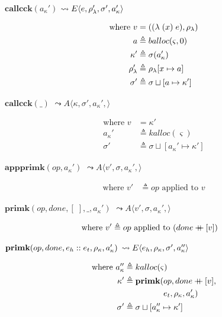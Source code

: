 \documentclass[12pt,draft]{article}
\newcommand\mdoubleplus{\ensuremath{\mathbin{+\mkern-9mu+}}}
\newcommand{\singlelamsyn}[2]{(\lambda\;(#1)\;#2)}
\newcommand{\store}[0]{\sigma}
\newcommand{\baddr}[0]{a}
\newcommand{\kaddr}[0]{a_{\kappa}}
\newcommand{\kont}[0]{\kappa}
\newcommand{\state}[0]{\varsigma}
\newcommand{\E}[4]{E\langle #1 , #2 , #3 , #4 \rangle}
\newcommand{\A}[4]{A\langle #1 , #2 , #3 , #4 \rangle}
\begin{document}
\begin{multicols*}{2}
\begin{center}
  $\textbf{callcck}(\kaddr')$
  $\leadsto \E{e}{\lamenv'}{\store'}{\kaddr'}$
\end{center}
\vspace{-7mm}
\begin{align*}
  \text{where }
  v &= (\singlelamsyn{x}{e} , \lamenv) \\
  \baddr &\triangleq balloc(\state, 0) \\
  \kont' &\triangleq \store(\kaddr') \\
  \lamenv' &\triangleq \lamenv[x \mapsto \baddr] \\
  \store' &\triangleq \store \sqcup [\baddr \mapsto \kont']
\end{align*}
\begin{center}
  $\textbf{callcck}(\_)$
  $\leadsto \A{\kont}{\store'}{\kaddr'}{}$
\end{center}
\vspace{-7mm}
\begin{align*}
  \text{where }
  v &= \kont' \\
  \kaddr' &\triangleq kalloc(\state) \\
  \store' &\triangleq \store \sqcup [\kaddr' \mapsto \kont']
\end{align*}
\begin{center}
  $\textbf{appprimk}(op, \kaddr')$
  $\leadsto \A{v'}{\store}{\kaddr'}{}$
\end{center}
\vspace{-7mm}
\begin{align*}
\text{where } v' &\triangleq op \text{ applied to } v
\end{align*}
\begin{center}
  $\textbf{primk}(op , done , [\;] , \_ , \kaddr')$
  $\leadsto \A{v'}{\store}{\kaddr'}{}$
\end{center}
\vspace{-7mm}
\begin{align*}
\text{where } v' &\triangleq op \text{ applied to } (done \mdoubleplus [v])
\end{align*}
\begin{center}
  $\textbf{primk}(op, done, e_h::e_t, \kenv, \kaddr')$
  $\leadsto \E{e_h}{\kenv}{\store'}{\kaddr''}$
\end{center}
\vspace{-7mm}
\begin{align*}
  \text{where }
  \kaddr'' &\triangleq kalloc(\state) \\
  \kont' &\triangleq \textbf{primk}(op, done \mdoubleplus [v],\\
           &\;\;\;\;\;\;\;\;\;\;\;\;\;\;\;\;\; e_t , \kenv , \kaddr') \\
  \store' &\triangleq \store \sqcup [\kaddr'' \mapsto \kont']
\end{align*}
\end{multicols*}
\newpage
\end{document}
